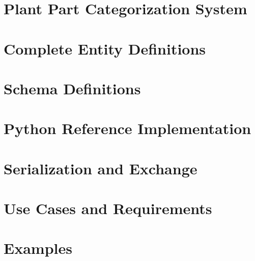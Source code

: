 \documentclass[12pt,a4paper]{article}
\begin{document}
\section{Plant Part Categorization System}
\label{sec:plant-parts}


\section{Complete Entity Definitions}
\label{sec:complete-entities}









\section{Schema Definitions}
\label{sec:schema-definitions}


\section{Python Reference Implementation}
\label{sec:python-implementation}


\section{Serialization and Exchange}
\label{sec:serialization}


\section{Use Cases and Requirements}
\label{sec:use-cases}


\section{Examples}
\label{sec:examples}

\end{document}
